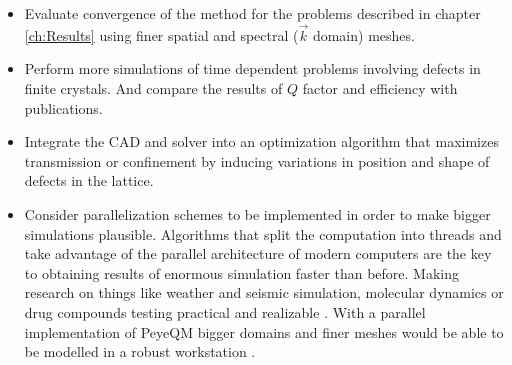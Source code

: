 \begin{itemize}
%
\item Evaluate convergence of the method for the problems described in chapter \ref{ch:Results} using finer spatial and spectral ($\vec{k}$ domain) meshes.
%
\item Perform more simulations of time dependent problems involving defects in finite crystals. And compare the results of $Q$ factor and efficiency with  publications.
%
\item Integrate the CAD and solver into an optimization algorithm that maximizes transmission or confinement by inducing variations in position and shape of defects in the lattice.
%
\item Consider parallelization schemes to be implemented in order to make bigger simulations plausible. Algorithms that split the computation into threads and take advantage of the parallel architecture of modern computers are the key to obtaining results of enormous simulation faster than before. Making research on things like weather and seismic simulation, molecular dynamics or drug compounds testing practical and realizable . With a parallel implementation of PeyeQM bigger domains and finer meshes would be able to be modelled in a robust workstation .
\end{itemize}


